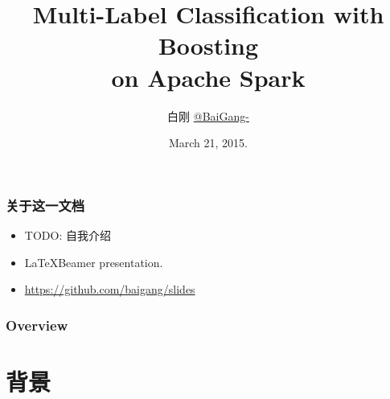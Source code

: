 \documentclass{beamer}
\title[MultiBoost]{Multi-Label Classification with Boosting \\ on Apache Spark}
\author{
白刚  \href{http://weibo.com/baigang111}{@BaiGang-}
} %
\institute[Sina] %
{
\textit{Sina Ad-Algo}
}
\date{March 21, 2015.} %
\begin{document}
\begin{frame}
\titlepage %
\end{frame}

\begin{frame}
\frametitle{关于这一文档}
\begin{itemize}
\item TODO: 自我介绍
\item \LaTeX Beamer presentation. 
\item \url{https://github.com/baigang/slides}
\end{itemize}
\end{frame}

\begin{frame}
\frametitle{Overview} %
\tableofcontents %
\end{frame}



\section{背景}
\end{document}
